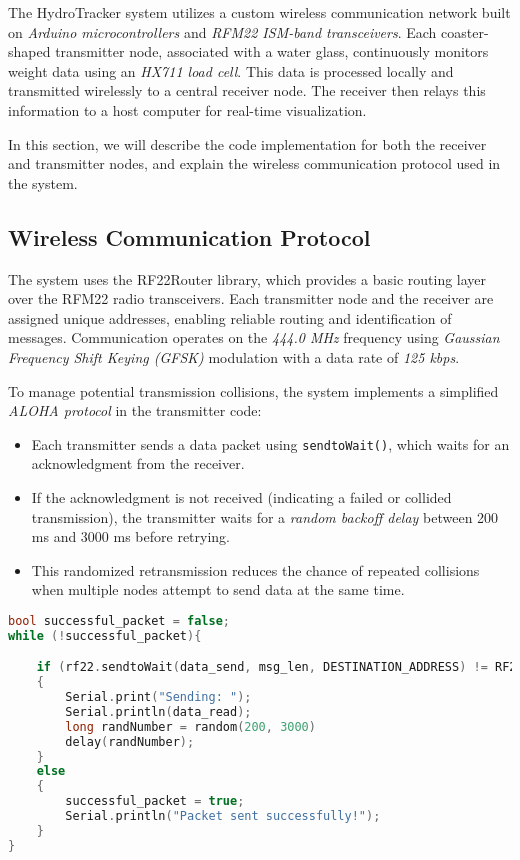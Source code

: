 The HydroTracker system utilizes a custom wireless communication network built on \textit{Arduino microcontrollers} and \textit{RFM22 ISM-band transceivers}. 
Each coaster-shaped transmitter node, associated with a water glass, continuously monitors weight data using an \textit{HX711 load cell}. 
This data is processed locally and transmitted wirelessly to a central receiver node. 
The receiver then relays this information to a host computer for real-time visualization.

In this section, we will describe the code implementation for both the receiver and transmitter nodes, and explain the wireless communication protocol used in the system.

\subsection{Wireless Communication Protocol}

The system uses the RF22Router library, which provides a basic routing layer over the RFM22 radio transceivers. 
Each transmitter node and the receiver are assigned unique addresses, enabling reliable routing and identification of messages. 
Communication operates on the \textit{444.0 MHz} frequency using \textit{Gaussian Frequency Shift Keying (GFSK)} modulation with a data rate of \textit{125 kbps}.

To manage potential transmission collisions, the system implements a simplified \textit{ALOHA protocol} in the transmitter code:
\begin{itemize}
    \item Each transmitter sends a data packet using \texttt{sendtoWait()}, which waits for an acknowledgment from the receiver.
    \item If the acknowledgment is not received (indicating a failed or collided transmission), the transmitter waits for a \textit{random backoff delay} between 200 ms and 3000 ms before retrying.
    \item This randomized retransmission reduces the chance of repeated collisions when multiple nodes attempt to send data at the same time.
\end{itemize}

\begin{lstlisting}[language=C++, caption={ALOHA protocol implementation in the transmitter}]
bool successful_packet = false;
while (!successful_packet){

    if (rf22.sendtoWait(data_send, msg_len, DESTINATION_ADDRESS) != RF22_ROUTER_ERROR_NONE)
    {
        Serial.print("Sending: ");
        Serial.println(data_read);
        long randNumber = random(200, 3000)
        delay(randNumber);
    }
    else
    {
        successful_packet = true;
        Serial.println("Packet sent successfully!");
    }
}
\end{lstlisting}

